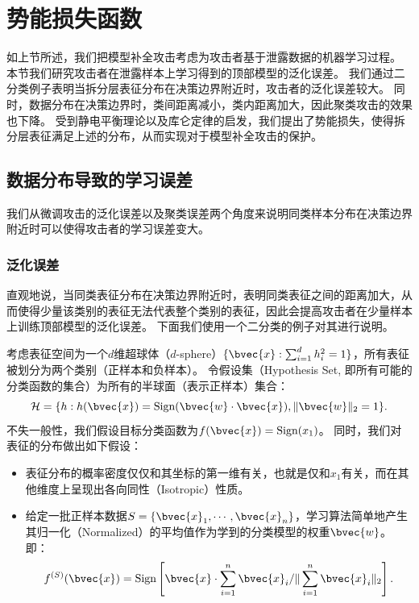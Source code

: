 \section{势能损失函数}
如上节所述，我们把模型补全攻击考虑为攻击者基于泄露数据的机器学习过程。
%
本节我们研究攻击者在泄露样本上学习得到的顶部模型的泛化误差。
我们通过二分类例子表明当拆分层表征分布在决策边界附近时，攻击者的泛化误差较大。
同时，数据分布在决策边界时，类间距离减小，类内距离加大，因此聚类攻击的效果也下降。
%
受到静电平衡理论以及库仑定律的启发，我们提出了势能损失，使得拆分层表征满足上述的分布，从而实现对于模型补全攻击的保护。
%

\subsection{数据分布导致的学习误差}
我们从微调攻击的泛化误差以及聚类误差两个角度来说明同类样本分布在决策边界附近时可以使得攻击者的学习误差变大。


\subsubsection{泛化误差}
直观地说，当同类表征分布在决策边界附近时，表明同类表征之间的距离加大，从而使得少量该类别的表征无法代表整个类别的表征，因此会提高攻击者在少量样本上训练顶部模型的泛化误差。
%
下面我们使用一个二分类的例子对其进行说明。
%

考虑表征空间为一个$d$维超球体（$d$-sphere）$\{ \bvec{x}: \sum_{i=1}^d h_i^2 = 1\}$，所有表征被划分为两个类别（正样本和负样本）。
令假设集（Hypothesis Set, 即所有可能的分类函数的集合）为所有的半球面（表示正样本）集合：
\begin{equation}
    \mathcal H = \{ h: h(\bvec{x}) = \text{Sign}(\bvec{w} \cdot \bvec{x}), \Vert \bvec{w} \Vert_2 = 1\}.
\end{equation}
不失一般性，我们假设目标分类函数为$f(\bvec{x}) = \text{Sign}(x_1)$。
同时，我们对表征的分布做出如下假设：
\begin{itemize}
    \item 表征分布的概率密度仅仅和其坐标的第一维有关，也就是仅和$x_1$有关，而在其他维度上呈现出各向同性（Isotropic）性质。
    \item 给定一批正样本数据$S = \{\bvec{x}_1, \cdots, \bvec{x}_n\}$，学习算法简单地产生其归一化（Normalized）的平均值作为学到的分类模型的权重$\bvec{w}$。
    即：
    \begin{equation}
        f^{(S)}(\bvec{x}) = \text{Sign}\left[ \bvec{x} \cdot \sum_{i=1}^n {\bvec{x}_i} / \Vert \sum_{i=1}^n {\bvec{x}_i}\Vert_2 \right].
    \end{equation}
\end{itemize}

